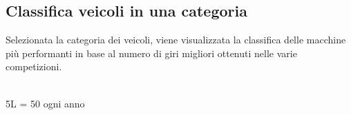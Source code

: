 \documentclass[a4paper,12pt]{report}
\begin{document}
			\subsection{Classifica veicoli in una categoria}
			{\fontsize{12.5}{20}\selectfont
		Selezionata la categoria dei veicoli, viene visualizzata la classifica delle macchine più performanti in base al numero
		di giri migliori ottenuti nelle varie competizioni.}
		\begin{table}[!htb]
			\centering
			\begin{center}
			\newline\\
			5L = 50 ogni anno\\
			\end{center}
		\end{table}\\
\end{document}
